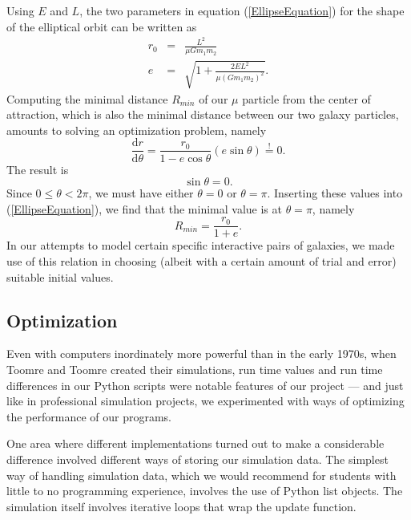 \documentclass[11pt,twocolumn]{article}
\begin{document}
Using $E$ and $L$, the two parameters in equation (\ref{EllipseEquation}) for the shape of the elliptical orbit can be written as
       \begin{eqnarray}
        r_0 &=& \frac{L^2}{\mu G m_1 m_2}\\[0.5em]
        e\phantom{{}_0} &=& \sqrt{1 + \frac{2 E L^2}{\mu (Gm_1m_2)^2}}.
        \end{eqnarray}
Computing the minimal distance $R_{min}$ of our $\mu$ particle from the center of attraction, which is also the minimal distance between our two galaxy particles, amounts to solving an optimization problem, namely
        \begin{equation}
        \frac{\mathrm{d}r}{\mathrm{d}\theta} = \frac{r_0}{1 - e\cos\theta} (e\sin\theta) \stackrel{!}{=}0.
        \end{equation}
The result is      
 \begin{equation}
       \sin\theta = 0.
       \end{equation}
Since $0 \leq \theta < 2\pi$, we must have either $\theta = 0$ or $\theta = \pi$. Inserting these values into (\ref{EllipseEquation}), we find that the minimal value is at $\theta=\pi$, namely
         \begin{equation}
       R_{min} = \frac{r_0}{1 + e}.
       \end{equation}
In our attempts to model certain specific interactive pairs of galaxies, we made use of this relation in choosing (albeit with a certain amount of trial and error) suitable initial values.

\subsection{Optimization}
\label{Optimization}

Even with computers inordinately more powerful than in the early 1970s, when Toomre and Toomre created their simulations, run time values and run time differences in our Python scripts were notable features of our project --- and just like in professional simulation projects, we experimented with ways of optimizing the performance of our programs. 

One area where different implementations turned out to make a considerable difference involved different ways of storing our simulation data. The simplest way of handling simulation data, which we would recommend for students with little to no programming experience, involves the use of Python list objects. The simulation itself involves iterative loops that wrap the update function. 
\end{document}
